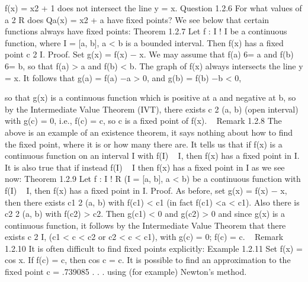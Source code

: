 \documentclass[12pt]{article}
\begin{document}
\begin{enumerate}
\begin{enumerate}
f(x) = x2 + 1 does not intersect the line y = x.
Question 1.2.6 For what values of a 2 R does Qa(x) = x2 + a have fixed points?
We see below that certain functions always have fixed points:
Theorem 1.2.7 Let f : I ! I be a continuous function, where I = [a, b], a < b is a
bounded interval. Then f(x) has a fixed point c 2 I.
Proof. Set g(x) = f(x) − x. We may assume that f(a) 6= a and f(b) 6= b, so that
f(a) > a and f(b) < b.
The graph of f(x) always intersects the line y = x.
It follows that
g(a) = f(a) −a > 0, and g(b) = f(b) −b < 0,

so that g(x) is a continuous function which is positive at a and negative at b, so by
the Intermediate Value Theorem (IVT), there exists c 2 (a, b) (open interval) with
g(c) = 0, i.e., f(c) = c, so c is a fixed point of f(x).  
Remark 1.2.8 The above is an example of an existence theorem, it says nothing
about how to find the fixed point, where it is or how many there are. It tells us that
if f(x) is a continuous function on an interval I with f(I)   I, then f(x) has a fixed
point in I. It is also true that if instead f(I)   I then f(x) has a fixed point in I as
we see now:
Theorem 1.2.9 Let f : I ! R (I = [a, b], a < b) be a continuous function with
f(I)   I, then f(x) has a fixed point in I.
Proof. As before, set g(x) = f(x) − x, then there exists c1 2 (a, b) with f(c1) < c1
(in fact f(c1) <a < c1). Also there is c2 2 (a, b) with f(c2) > c2.
Then g(c1) < 0 and g(c2) > 0 and since g(x) is a continuous function, it follows by
the Intermediate Value Theorem that there exists c 2 I, (c1 < c < c2 or c2 < c < c1),
with g(c) = 0; f(c) = c.  
Remark 1.2.10 It is often difficult to find fixed points explicitly:
Example 1.2.11 Set f(x) = cos x. If f(c) = c, then cos c = c. It is possible to find
an approximation to the fixed point c = .739085 . . . using (for example) Newton’s
method.


\end{enumerate}
\end{enumerate}
\end{document}

